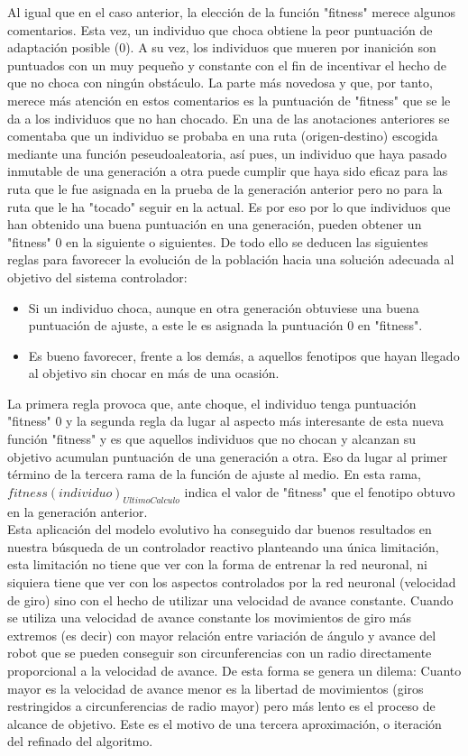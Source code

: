 \documentclass[12pt,spanish]{article}
\begin{document}
Al igual que en el caso anterior, la elección de la función "fitness" merece algunos comentarios. Esta vez, un individuo que choca obtiene la peor puntuación de adaptación posible (0). A su vez, los individuos que mueren por inanición son puntuados con un muy pequeño y constante con el fin de incentivar el hecho de que no choca con ningún obstáculo. La parte más novedosa y que, por tanto, merece más atención en estos comentarios es la puntuación de "fitness" 	que se le da a los individuos que no han chocado. En una de las anotaciones anteriores se comentaba que un individuo se probaba en una ruta (origen-destino) escogida mediante una función peseudoaleatoria, así pues, un individuo que haya pasado inmutable de una generación a otra puede cumplir que haya sido eficaz para las ruta que le fue asignada en la prueba de la generación anterior pero no para la ruta que le ha "tocado" seguir en la actual. Es por eso por lo que individuos que han obtenido una buena puntuación en una generación, pueden obtener un "fitness" 0 en la siguiente o siguientes. De todo ello se deducen las siguientes reglas para favorecer la evolución de la población hacia una solución adecuada al objetivo del sistema controlador:
\begin{itemize}
	\item Si un individuo choca, aunque en otra generación obtuviese una buena puntuación de ajuste, a este le es asignada la puntuación 0 en "fitness".
	\item Es bueno favorecer, frente a los demás, a aquellos fenotipos que hayan llegado al objetivo sin chocar en más de una ocasión.
\end{itemize}
La primera regla provoca que, ante choque, el individuo tenga puntuación "fitness" 0 y la segunda regla da lugar al aspecto más interesante de esta nueva función "fitness" y es que aquellos individuos que no chocan y alcanzan su objetivo acumulan puntuación de una generación a otra. Eso da lugar al primer término de la tercera rama de la función de ajuste al medio. En esta rama, $fitness(individuo)_{UltimoCalculo}$ indica el valor de "fitness" que el fenotipo obtuvo en la generación anterior.\\
Esta aplicación del modelo evolutivo ha conseguido dar buenos resultados en nuestra búsqueda de un controlador reactivo planteando una única limitación, esta limitación no tiene que ver con la forma de entrenar la red neuronal, ni siquiera tiene que ver con los aspectos controlados por la red neuronal (velocidad de giro) sino con el hecho de utilizar una velocidad de avance constante. Cuando se utiliza una velocidad de avance constante los movimientos de giro más extremos (es decir) con mayor relación entre variación de ángulo y avance del robot que se pueden conseguir son circunferencias con un radio directamente proporcional a la velocidad de avance. De esta forma se genera un dilema: Cuanto mayor es la velocidad de avance menor es la libertad de movimientos (giros restringidos a circunferencias de radio mayor) pero más lento es el proceso de alcance de objetivo. Este es el motivo de una tercera aproximación, o iteración del refinado del algoritmo.
\end{document}
